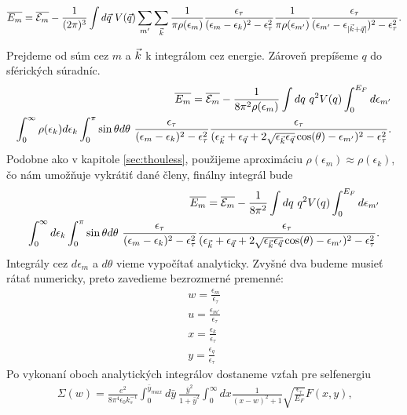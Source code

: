 \begin{align}
\label{eq:05energy3}
\overline{E_m}=\overline{\mathcal{E}_m} - \frac{1}{(2\pi)^3} \int d\vec{q}\ V(\vec{q}) \sum_{m'}\sum_{\vec{k}}\frac{1}{\pi\rho(\epsilon_m)}\frac{\epsilon_\tau}{(\epsilon_m-\epsilon_k)^2-\epsilon_\tau^2}\frac{1}{\pi\rho(\epsilon_{m'})}\frac{\epsilon_\tau}{(\epsilon_{m'}-\epsilon_{|\vec{k}+\vec{q}|})^2-\epsilon_\tau^2} \text{.}
\end{align}

Prejdeme od súm cez $m$ a $\vec{k}$ k integrálom cez energie. Zároveň prepíšeme $q$ do sférických súradníc. 
\begin{align}
\label{eq:05energy4}
\notag
\overline{E_m}=\overline{\E_m} - \frac{1}{8\pi^2\rho(\epsilon_m)} \int dq\ q^2 V(q) \int_0^{E_F} d\epsilon_{m'} \\
\int_0^{\infty} \rho(\epsilon_k) d \epsilon_k \int_0^\pi \sin\theta d\theta\ \frac{\epsilon_\tau}{(\epsilon_m-\epsilon_k)^2-\epsilon_\tau^2}\frac{\epsilon_\tau}{(\epsilon_{\vk}+\epsilon_{\vq}+2\sqrt{\epsilon_{\vk}\epsilon_{\vq}}\cos(\theta)-\epsilon_{m'})^2-\epsilon_\tau^2} \text{.} 
\end{align}
Podobne ako v kapitole \ref{sec:thouless}, použijeme aproximáciu $\rho(\epsilon_m)\approx\rho(\epsilon_k)$, čo nám umožňuje vykrátiť dané členy, finálny integrál bude
\begin{align}
\label{eq:05energy5}
\notag
\overline{E_m}=\overline{\mathcal{E}_m} - \frac{1}{8\pi^2} \int dq\ q^2 V(q) \int_0^{E_F} d\epsilon_{m'} \\
\int_0^{\infty} d \epsilon_k  \int_0^\pi \sin\theta d\theta\  \frac{\epsilon_\tau}{(\epsilon_m-\epsilon_k)^2-\epsilon_\tau^2}\frac{\epsilon_\tau}{(\epsilon_{\vec{k}}+\epsilon_{\vec{q}}+2\sqrt{\epsilon_{\vec{k}}\epsilon_{\vec{q}}}\cos(\theta)-\epsilon_{m'})^2-\epsilon_\tau^2} \text{.} 
\end{align}
Integrály cez $d\epsilon_m$ a $d\theta$ vieme vypočítať analyticky. Zvyšné dva budeme musieť rátať numericky, preto zavedieme bezrozmerné premenné:
\begin{align*}
w=\frac{\epsilon_m}{\epsilon_\tau} \\
u=\frac{\epsilon_{m'}}{\epsilon_\tau} \\
x=\frac{\epsilon_k}{\epsilon_\tau} \\
y=\frac{\epsilon_q}{\epsilon_\tau} 
\end{align*}
Po vykonaní oboch analytických integrálov dostaneme vzťah pre selfenergiu
\begin{align}
\label{eq:05selfenergy}
\Sigma(w)=\frac{e^2}{8\pi^4\epsilon_0 k_s^{-1}} \int_0^{\bar y_{max}} d\bar{y}\ \frac{\bar{y}^2}{1+\bar{y}^2}\int_0^{\infty} dx \frac{1}{(x-w)^2+1}\sqrt{\frac{\epsilon_\tau}{E_F}}F(x,y) \text{,}
\end{align}
